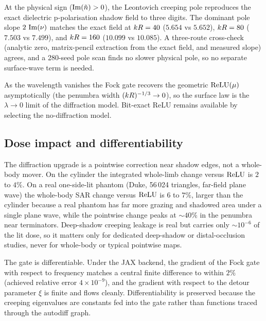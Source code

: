 \begin{proposition}\label{prop:pole}
At the physical sign ($\operatorname{Im}(\tilde{n}) > 0$), the Leontovich creeping pole
reproduces the exact dielectric p-polarisation shadow field to three digits. The
dominant pole slope $2\,\operatorname{Im}(\nu)$ matches the exact field at $kR = 40$
($5.654$ vs $5.652$), $kR = 80$ ($7.503$ vs $7.499$), and
$kR = 160$ ($10.099$ vs $10.085$). A three-route cross-check (analytic
zero, matrix-pencil extraction from the exact field, and measured slope) agrees,
and a 280-seed pole scan finds no slower physical pole, so no separate
surface-wave term is needed.
\end{proposition}

As the wavelength vanishes the Fock gate recovers the geometric $\operatorname{ReLU}(\mu)$
asymptotically (the penumbra width $(kR)^{-1/3}\to 0$), so the surface law
is the $\lambda\to 0$ limit of the diffraction model. Bit-exact ReLU remains
available by selecting the no-diffraction model.

\subsection{Dose impact and differentiability}
\label{sec:val-dose}

The diffraction upgrade is a pointwise correction near shadow edges, not a
whole-body mover. On the cylinder the integrated whole-limb change versus
$\operatorname{ReLU}$ is $2$ to $4\%$. On a real one-side-lit phantom (Duke, 56\,024
triangles, far-field plane wave) the whole-body SAR change versus $\operatorname{ReLU}$ is
$6$ to $7\%$, larger than the cylinder because a real phantom has far more
grazing and shadowed area under a single plane wave, while the pointwise change
peaks at $\sim 40\%$ in the penumbra near terminators. Deep-shadow creeping
leakage is real but carries only $\sim 10^{-6}$ of the lit dose, so it matters
only for dedicated deep-shadow or distal-occlusion studies, never for whole-body
or typical pointwise maps.

The gate is differentiable. Under the JAX backend, the gradient of the Fock gate
with respect to frequency matches a central finite difference to within $2\%$
(achieved relative error $4\times 10^{-9}$), and the gradient with respect to
the detour parameter $\xi$ is finite and flows cleanly. Differentiability is
preserved because the creeping eigenvalues are constants fed into the gate
rather than functions traced through the autodiff graph.

